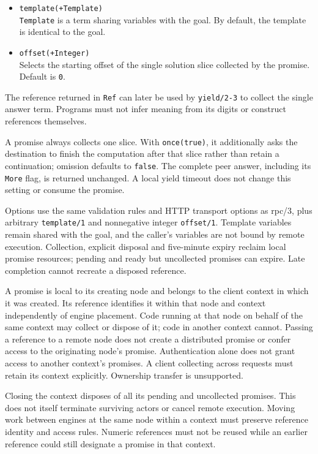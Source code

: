 \begin{itemize}
\item
  \texttt{template(\allowbreak{}+Template)}\\
  \texttt{Template} is a term sharing variables with the goal. By default, the
  template is identical to the goal.
\item
  \texttt{offset(\allowbreak{}+Integer)}\\
  Selects the starting offset of the single solution slice collected by the
  promise. Default is \texttt{0}.
\end{itemize}

The reference returned in \texttt{Ref} can later be used by \texttt{yield/\allowbreak{}2-3} to collect the single
answer term. Programs must not infer meaning from its digits or construct references themselves.

A promise always collects one slice. With \texttt{once(true)}, it additionally
asks the destination to finish the computation after that slice rather than
retain a continuation; omission defaults to \texttt{false}. The complete peer
answer, including its \texttt{More} flag, is returned unchanged. A local yield
timeout does not change this setting or consume the promise.

Options use the same validation rules and HTTP transport options as rpc/3, plus arbitrary
\texttt{template/\allowbreak{}1} and nonnegative integer \texttt{offset/\allowbreak{}1}. Template variables remain shared with
the goal, and the caller's variables are not bound by remote execution. Collection, explicit
disposal and five-minute expiry reclaim local promise resources; pending and ready but uncollected
promises can expire. Late completion cannot recreate a disposed reference.

A promise is local to its creating node and belongs to the client context
in which it was created. Its reference identifies it within that node and
context independently of engine placement. Code running at that node on
behalf of the same context may collect or dispose of it; code in another
context cannot. Passing a reference to a remote node does not create a
distributed promise or confer access to the originating node's promise. Authentication alone does not grant access
to another context's promises. A client collecting across requests must retain
its context explicitly. Ownership transfer is unsupported.

Closing the context disposes of all its pending and uncollected promises.
This does not itself terminate surviving actors or cancel remote execution.
Moving work between engines at the same node within a context must preserve reference identity
and access rules. Numeric references must not be reused while an earlier
reference could still designate a promise in that context.


